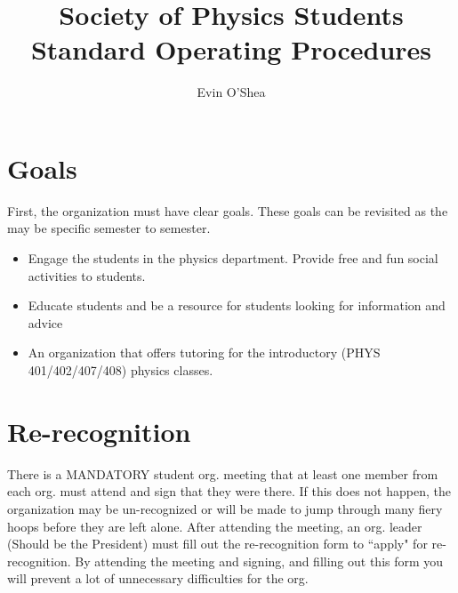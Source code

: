 \documentclass[12pt,epsfig]{article}
\begin{document}
\title{Society of Physics Students Standard Operating Procedures}
\author{Evin O'Shea}

\maketitle




\newpage

\pagestyle{plain}

\tableofcontents

\newpage

\section{Goals}
First, the organization must have clear goals. These goals can be revisited as the may be specific semester to semester.
\begin{itemize}
	\item Engage the students in the physics department. Provide free and fun social activities to students.

	\item Educate students and be a resource for students looking for information and advice

	\item An organization that offers tutoring for the introductory (PHYS 401/402/407/408) physics classes.
\end{itemize}

\section{Re-recognition}
There is a MANDATORY student org. meeting that at least one member from each org. must attend and sign that they were there. If this does not happen, the organization may be un-recognized or will be made to jump through many fiery hoops before they are left alone. After attending the meeting, an org. leader (Should be the President) must fill out the re-recognition form to ``apply" for re-recognition. By attending the meeting and signing, and filling out this form you will prevent a lot of unnecessary difficulties for the org.
\end{document}
